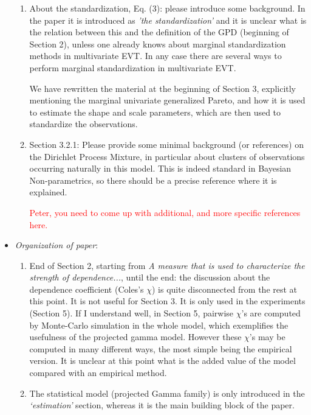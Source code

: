 \documentclass[10pt]{article}
\newcommand{\bruno}[1]{\textcolor{red}{#1}}
\begin{document}
\begin{itemize}
\begin{enumerate}
        \item About the standardization, Eq. (3): please introduce some background. In the paper it is
        introduced as \emph{’the standardization’} and it is unclear what is the relation between this 
        and the definition of the GPD (beginning of Section 2), unless one already knows about marginal
        standardization methods in multivariate EVT. In any case there are several ways to perform 
        marginal standardization in multivariate EVT.

        We have rewritten the material at the beginning of Section 3, explicitly mentioning the marginal
        univariate generalized Pareto, and how it is used to estimate the shape and scale parameters, 
        which are then used to standardize the observations.

        \item Section 3.2.1: Please provide some minimal background (or references) on the Dirichlet 
        Process Mixture, in particular about clusters of observations occurring naturally in this 
        model. This is indeed standard in Bayesian Non-parametrics, so there should be a precise 
        reference where it is explained.

        \bruno{Peter, you need to come up with additional, and more specific references here.}

        
    \end{enumerate}

    \item \emph{Organization of paper}:
        \begin{enumerate}
            \item End of Section 2, starting from \emph{A measure that is used to characterize 
            the strength of dependence...}, until the end: the discussion about the dependence 
            coefficient (Coles’s $\chi$) is quite disconnected from the rest at this point. It
            is not useful for Section 3. It is only used in the experiments (Section 5). If I 
            understand well, in Section 5, pairwise $\chi$’s are computed by Monte-Carlo simulation 
            in the whole model, which exemplifies the usefulness of the projected gamma model. 
            However these $\chi$’s may be computed in many different ways, the most simple being 
            the empirical version. It is unclear at this point what is the added value of the 
            model compared with an empirical method.

            \item The statistical model (projected Gamma family) is only introduced in the
            \emph{‘estimation’} section, whereas it is the main building block of the paper.


\end{enumerate}
\end{itemize}
\end{document}
